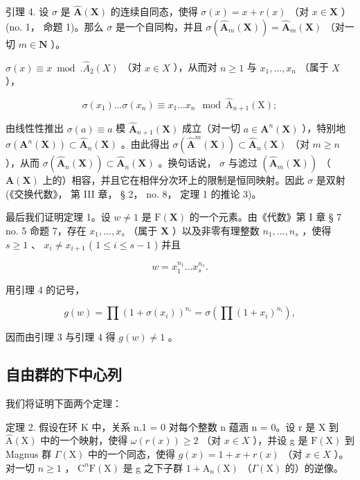 引理 4. 设 \(\sigma\) 是 \(\hat{\mathbf{A}}(\mathbf{X})\) 的连续自同态，使得 \(\sigma(x) = x + r(x)\) （对 \(x \in \mathbf{X}\) ）(no. 1， 命题 1)。那么 \(\sigma\) 是一个自同构，并且 \(\sigma(\hat{\mathbf{A}}_m(\mathbf{X})) = \hat{\mathbf{A}}_m(\mathbf{X})\) （对一切 \(m \in \mathbf{N}\) ）。

\(\sigma(x) \equiv x \bmod. \hat{A}_2(X)\) （对 \(x \in X\) ），从而对 \(n \geqslant 1\) 与 \(x_1, \ldots, x_n\) （属于 \(X\) ），

\[
\sigma (x _ {1}) \dots \sigma (x _ {n}) \equiv x _ {1} \dots x _ {n} \mod \hat {\mathrm{A}} _ {n + 1} (\mathrm{X});
\]

由线性性推出 \(\sigma(a) \equiv a\) 模 \(\hat{\mathbf{A}}_{n+1}(\mathbf{X})\) 成立（对一切 \(a \in \mathbf{A}^n(\mathbf{X})\) ），特别地 \(\sigma(\mathbf{A}^n(\mathbf{X})) \subset \hat{\mathbf{A}}_n(\mathbf{X})\) 。由此得出 \(\sigma(\hat{\mathbf{A}}^m(\mathbf{X})) \subset \hat{\mathbf{A}}_n(\mathbf{X})\) （对 \(m \geqslant n\) ），从而 \(\sigma(\hat{\mathbf{A}}_n(\mathbf{X})) \subset \hat{\mathbf{A}}_n(\mathbf{X})\) 。换句话说， \(\sigma\) 与滤过 \((\hat{\mathbf{A}}_m(\mathbf{X}))\) （\(\mathbf{A}(\mathbf{X})\) 上的）相容，并且它在相伴分次环上的限制是恒同映射。因此 \(\sigma\) 是双射 (《交换代数》， 第 III 章， § 2， no. 8， 定理 1 的推论 3)。

最后我们证明定理 1。设 \(w \neq 1\) 是 \(\mathrm{F}(\mathbf{X})\) 的一个元素。由《代数》第 I 章 § 7 no. 5 命题 7，存在 \(x_{1}, \ldots, x_{s}\) （属于 \(\mathbf{X}\) ）以及非零有理整数 \(n_{1}, \ldots, n_{s}\) ，使得 \(s \geqslant 1\) 、 \(x_{i} \neq x_{i+1}\) ( \(1 \leqslant i \leqslant s - 1\) ) 并且

\[
w = x _ {1} ^ {n _ {1}} \dots x _ {s} ^ {n _ {s}}.
\]

用引理 4 的记号，

\[
g (w) = \prod (1 + \sigma (x _ {i})) ^ {n _ {i}} = \sigma (\prod (1 + x _ {i}) ^ {n _ {i}}),
\]

因而由引理 3 与引理 4 得 \(g(w) \neq 1\) 。

\subsection{自由群的下中心列}

我们将证明下面两个定理：

定理 2. 假设在环 K 中，关系 n.1 = 0 对每个整数 n 蕴涵 n = 0。设 r 是 X 到 \(\hat{\mathrm{A}}(\mathrm{X})\) 中的一个映射，使得 \(\omega(r(x)) \geqslant 2\) （对 \(x \in X\) ），并设 g 是 \(\mathrm{F}(\mathrm{X})\) 到 Magnus 群 \(\Gamma(\mathrm{X})\) 中的一个同态，使得 \(g(x) = 1 + x + r(x)\) （对 \(x \in X\) ）。对一切 \(n \geqslant 1\) ， \(\mathrm{C}^n\mathrm{F}(\mathrm{X})\) 是 g 之下子群 \(1 + \hat{\mathrm{A}}_n(\mathrm{X})\) （\(\Gamma(\mathrm{X})\) 的）的逆像。

